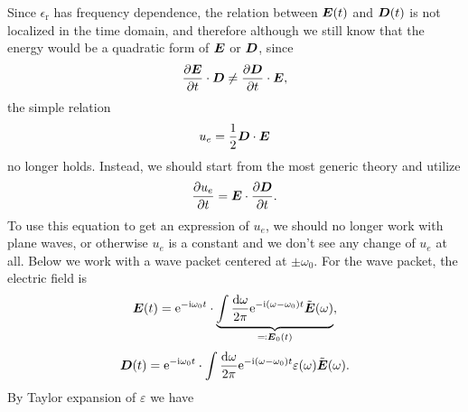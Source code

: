 \documentclass[hyperref, a4paper]{article}
\newcommand*{\ii}{\mathrm{i}}
\newcommand*{\ee}{\mathrm{e}}
\newcommand{\epsr}{\epsilon_{\text{r}}}
\newcommand{\Efreq}{\tilde{\vb*{E}}}
\begin{document}
Since $\epsr$ has frequency dependence,
the relation between $\vb*{E}(t)$ and $\vb*{D}(t)$ 
is not localized in the time domain,
and therefore although we still know that 
the energy would be a quadratic form of $\vb*{E}$ or $\vb*{D}$,
since 
\begin{equation}
    \pdv{\vb*{E}}{t} \cdot \vb*{D} \neq \pdv{\vb*{D}}{t} \cdot \vb*{E},
\end{equation}
the simple relation 
\[
    u_e = \frac{1}{2} \vb*{D} \cdot \vb*{E} 
\]
no longer holds.
Instead, we should start from the most generic theory 
and utilize 
\begin{equation}
    \pdv{u_e}{t} = \vb*{E} \cdot \pdv{\vb*{D}}{t}.
    \label{eq:change-of-ue}
\end{equation} 
To use this equation to get an expression of $u_e$,
we should no longer work with plane waves, 
or otherwise $u_e$ is a constant and 
we don't see any change of $u_e$ at all.
Below we work with a wave packet centered at $\pm \omega_0$.
For the wave packet, the electric field is 
\begin{equation}
    \vb*{E}(t) = \ee^{- \ii \omega_0 t} \cdot 
        \underbrace{
            \int \frac{\dd{\omega}}{2\pi} \ee^{- \ii (\omega - \omega_0) t}
            \Efreq(\omega)
        }_{\eqqcolon \vb*{E}_0(t)},
\end{equation}
\begin{equation}
    \vb*{D}(t) = \ee^{- \ii \omega_0 t} \cdot 
        \int \frac{\dd{\omega}}{2\pi} \ee^{- \ii (\omega - \omega_0) t}
            \varepsilon(\omega) \Efreq(\omega) .
\end{equation}
By Taylor expansion of $\varepsilon$ we have 
\end{document}
